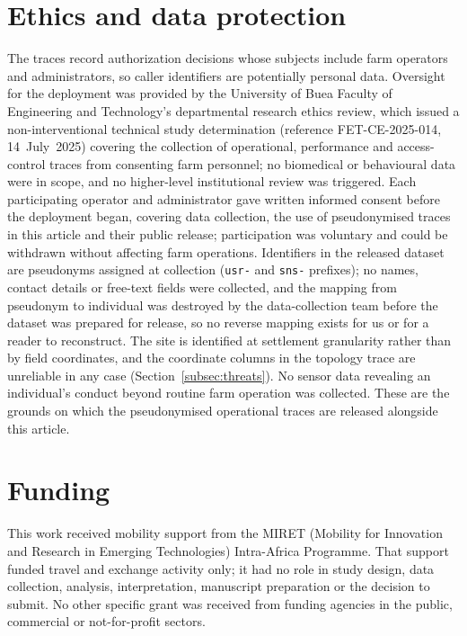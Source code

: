 \documentclass[a4paper,fleqn]{cas-sc}
\begin{document}
\section*{Ethics and data protection}

The traces record authorization decisions whose subjects include farm
operators and administrators, so caller identifiers are potentially personal
data. Oversight for the deployment was provided by the University of Buea
Faculty of Engineering and Technology's departmental research ethics review,
which issued a non-interventional technical study determination
(reference FET-CE-2025-014, 14~July~2025) covering the collection of
operational, performance and access-control traces from consenting farm
personnel; no biomedical or behavioural data were in scope, and no
higher-level institutional review was triggered. Each participating operator
and administrator gave written informed consent before the deployment began,
covering data collection, the use of pseudonymised traces in this article and
their public release; participation was voluntary and could be withdrawn
without affecting farm operations. Identifiers in the released dataset are
pseudonyms assigned at collection (\texttt{usr-} and \texttt{sns-} prefixes);
no names, contact details or free-text fields were collected, and the
mapping from pseudonym to individual was destroyed by the data-collection
team before the dataset was prepared for release, so no reverse mapping
exists for us or for a reader to reconstruct. The site is identified at
settlement granularity rather than by field coordinates, and the coordinate
columns in the topology trace are unreliable in any case
(Section~\ref{subsec:threats}). No sensor data revealing an individual's
conduct beyond routine farm operation was collected. These are the grounds
on which the pseudonymised operational traces are released alongside this
article.

\section*{Funding}

This work received mobility support from the MIRET (Mobility for
Innovation and Research in Emerging Technologies) Intra-Africa Programme.
That support funded travel and exchange activity only; it had no role in
study design, data collection, analysis, interpretation, manuscript
preparation or the decision to submit. No other specific grant was
received from funding agencies in the public, commercial or
not-for-profit sectors.
\end{document}
